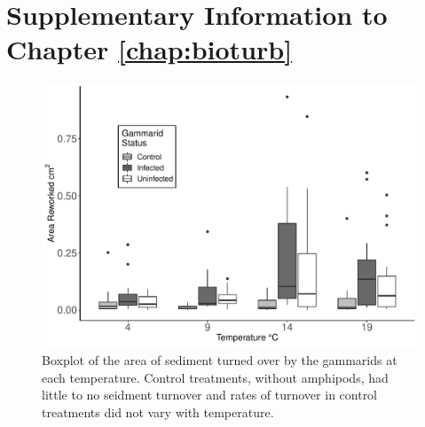 \chapter{Supplementary Information to Chapter \ref{chap:bioturb}}%
\label{chap:Appendix B}

\begin{figure}[H]
    \centering
    \includegraphics[keepaspectratio,width=\textwidth]{figures/ch3/bioturbctl.pdf}
  \caption [Surface sediment reworked with no amphipods, infected amphipods, and uninfected amphipods.]{Boxplot of the area of sediment turned over by the gammarids at each temperature. Control treatments, without amphipods, had little to no seidment turnover and rates of turnover in control treatments did not vary with temperature.} 
    \label{fig:bioturbboxctl}
\end{figure}

%
%

